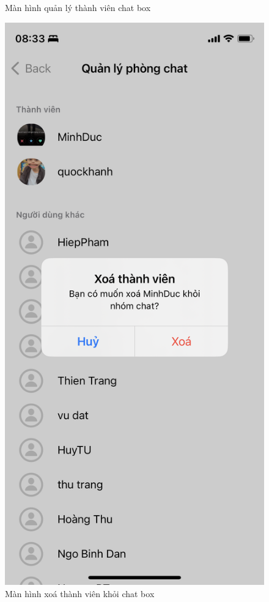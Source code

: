 \documentclass[../DoAn.tex]{subfiles}
\begin{document}
\begin{figure}[H]
\begin{minipage}{0.5\textwidth}
\caption{Màn hình quản lý thành viên chat box} \label{fig:screen_login}
\end{minipage}
\hspace{\fill}
\begin{minipage}{0.5\textwidth}
\includegraphics[width=0.95\linewidth]{Hinhve/Application/Managing_Chatbox_Remove_Member.png}
\caption{Màn hình xoá thành viên khỏi chat box} \label{fig:list_task}
\end{minipage}
\end{figure}
\end{document}
